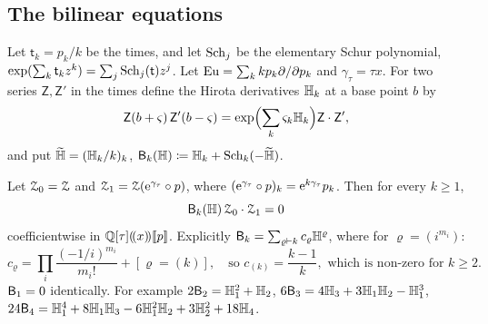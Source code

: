 \subsection{The bilinear equations}
\label{sec:van-bil}

Let $\mathsf{t}_k=p_k/k$ be the times, and let $\mathrm{Sch}_j$ be the elementary Schur polynomial, $\exp(\sum_k\mathsf{t}_kz^k)=\sum_j\mathrm{Sch}_j(\mathsf{t})z^j$. Let $\mathrm{Eu}=\sum_kkp_k\partial/\partial p_k$ and $\gamma_\tau=\tau x$. For two series $\mathsf{Z},\mathsf{Z}'$ in the times define the Hirota derivatives $\mathbb{H}_k$ at a base point $b$ by
\[
\mathsf{Z}(b+\varsigma)\,\mathsf{Z}'(b-\varsigma)=\exp\Bigl(\sum_k\varsigma_k\mathbb{H}_k\Bigr)\mathsf{Z}\cdot\mathsf{Z}',
\]
and put $\widetilde{\mathbb{H}}=(\mathbb{H}_k/k)_k$, $\mathsf{B}_k(\mathbb{H})\coloneqq\mathbb{H}_k+\mathrm{Sch}_k(-\widetilde{\mathbb{H}})$.

\begin{prop}\label{prop:van-bil}
Let $\mathcal{Z}_0=\mathcal{Z}$ and $\mathcal{Z}_1=\mathcal{Z}(\mathrm{e}^{\gamma_\tau}\circ p)$, where $(\mathrm{e}^{\gamma_\tau}\circ p)_k=\mathrm{e}^{k\gamma_\tau}p_k$. Then for every $k\geq 1$,
\begin{equation}\label{eq:van-bil}
\mathsf{B}_k(\mathbb{H})\,\mathcal{Z}_0\cdot\mathcal{Z}_1=0
\end{equation}
coefficientwise in $\mathbb{Q}[\tau](\!(x)\!)[\![ p ]\!]$. Explicitly $\mathsf{B}_k=\sum_{\varrho\vdash k}c_\varrho\mathbb{H}^\varrho$, where for $\varrho=(i^{m_i})$:
\begin{equation}\label{eq:van-bilc}
c_\varrho=\prod_i\frac{(-1/i)^{m_i}}{m_i!}+[\varrho=(k)],\quad\text{so } c_{(k)}=\frac{k-1}{k},\text{ which is non-zero for }k\geq 2.
\end{equation}
$\mathsf{B}_1=0$ identically. For example $2\mathsf{B}_2=\mathbb{H}_1^2+\mathbb{H}_2$, $6\mathsf{B}_3=4\mathbb{H}_3+3\mathbb{H}_1\mathbb{H}_2-\mathbb{H}_1^3$, $24\mathsf{B}_4=\mathbb{H}_1^4+8\mathbb{H}_1\mathbb{H}_3-6\mathbb{H}_1^2\mathbb{H}_2+3\mathbb{H}_2^2+18\mathbb{H}_4$.
\end{prop}

